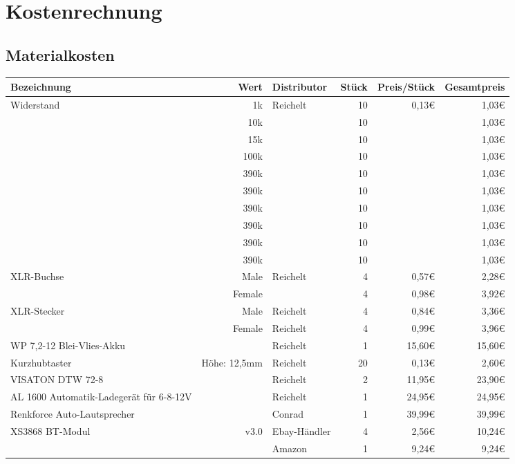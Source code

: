 \section{Kostenrechnung}	
\subsection{Materialkosten}
\let\texteuro\euro %
\begin{table}
\begin{tabularx}{\textwidth}{p{}|r|X|r|r|r}
	Bezeichnung & Wert & Distributor& Stück & Preis/Stück & Gesamtpreis\\
	\hline
	\multirow{10}{*}{Widerstand}
	& 1k	& \multirow{10}{*}{Reichelt} & 10 & \multirow{10}{*}{0,13€}	& 1,03€ \\
	& 10k	& 							 & 10 & 						& 1,03€ \\
	& 15k	& 							 & 10 & 						& 1,03€ \\
	& 100k	&							 & 10 & 						& 1,03€ \\
	& 390k	& 							 & 10 & 						& 1,03€ \\
	& 390k	&							 & 10 & 						& 1,03€ \\
	& 390k	& 							 & 10 & 						& 1,03€ \\
	& 390k	& 							 & 10 & 						& 1,03€ \\
	& 390k	& 							 & 10 & 						& 1,03€ \\
	& 390k	& 							 & 10 & 						& 1,03€ \\
	
	\hline
	\multirow{2}{*}{XLR-Buchse}
	& Male	& \multirow{2}{*}{Reichelt}	& 4	& 0,57€	& 2,28€ \\
	& Female	& 						& 4	& 0,98€	& 3,92€ \\
	
	\hline
	\multirow{2}{*}{XLR-Stecker}
	& Male	& Reichelt	& 4	& 0,84€	& 3,36€ \\
	& Female	& Reichelt	& 4	& 0,99€	& 3,96€ \\
	
	\hline
	WP 7,2-12 Blei-Vlies-Akku &  & Reichelt & 1 & 15,60€ & 15,60€\\
	
	\hline
	Kurzhubtaster & Höhe: 12,5mm  & Reichelt & 20 & 0,13€ & 2,60€ \\

	\hline
	VISATON DTW 72-8 &  & Reichelt & 2 & 11,95€ & 23,90€ \\
	
	\hline
	AL 1600 Automatik-Ladegerät für 6-8-12V &  & Reichelt & 1 & 24,95€ & 24,95€ \\

	\hline
	Renkforce Auto-Lautsprecher &  & Conrad & 1 & 39,99€ & 39,99€ \\
	
	\hline
	XS3868 BT-Modul &\multirow{2}{*}{v3.0}
	& Ebay-Händler & 4 & 2,56€ & 10,24€ \\
	& & Amazon & 1 & 9,24€ & 9,24€ \\
 	
	\hline
	
	
\end{tabularx}
\end{table}

